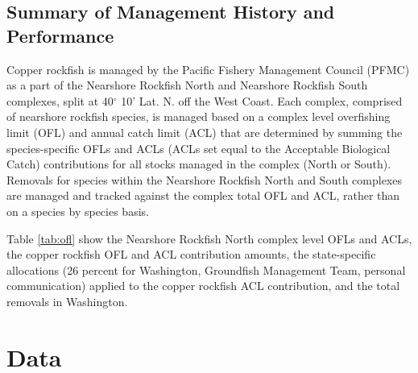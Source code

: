 \documentclass[11pt,
  english,
  a4paper,
]{article}
\begin{document}
\leavevmode\tagmcend\tagstructend\par


\hypertarget{summary-of-management-history-and-performance}{%
\subsection{Summary of Management History and Performance}\label{summary-of-management-history-and-performance}}

\leavevmode\tagmcend\tagstructend


Copper rockfish is managed by the Pacific Fishery Management Council (PFMC) as a part of the Nearshore Rockfish North and Nearshore Rockfish South complexes, split at 40{\(^\circ\)\leavevmode\tagmcend\tagstructend} 10' Lat. N. off the West Coast. Each complex, comprised of nearshore rockfish species, is managed based on a complex level overfishing limit (OFL) and annual catch limit (ACL) that are determined by summing the species-specific OFLs and ACLs (ACLs set equal to the Acceptable Biological Catch) contributions for all stocks managed in the complex (North or South). Removals for species within the Nearshore Rockfish North and South complexes are managed and tracked against the complex total OFL and ACL, rather than on a species by species basis.

\leavevmode\tagmcend\tagstructend\par


Table \ref{tab:ofl} show the Nearshore Rockfish North complex level OFLs and ACLs, the copper rockfish OFL and ACL contribution amounts, the state-specific allocations (26 percent for Washington, Groundfish Management Team, personal communication) applied to the copper rockfish ACL contribution, and the total removals in Washington.

\leavevmode\tagmcend\tagstructend\par


\hypertarget{data}{%
\section{Data}\label{data}}
\end{document}
